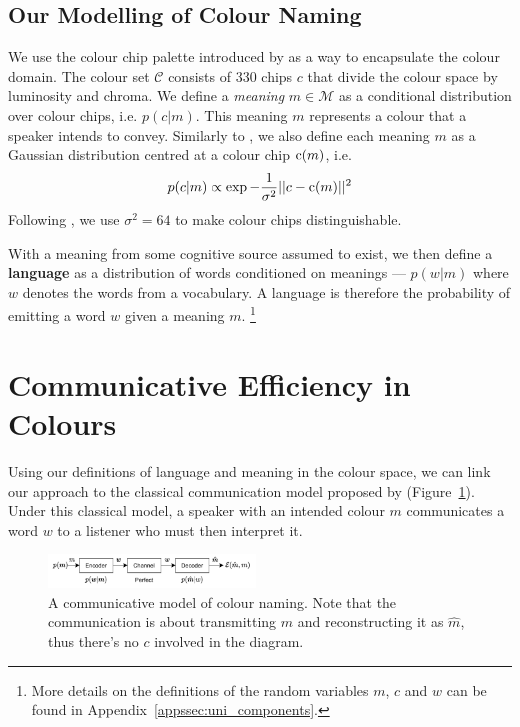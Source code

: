 \documentclass[11pt]{article}
\begin{document}
\subsection{Our Modelling of Colour Naming}
\label{ssec:method_uni_components}

We use the colour chip palette introduced by \citet{berlin1991basic} as a way to encapsulate the colour domain.
The colour set $\mathcal{C}$ consists of $330$ chips $c$ that divide the colour space by luminosity and chroma.
We define a \textit{meaning} $m\in\mathcal{M}$ as a conditional distribution over colour chips, i.e. $p(c|m)$.
This meaning $m$ represents a colour that a speaker intends to convey.
Similarly to \citet{zaslavsky2018efficient}, we also define each meaning $m$ as a Gaussian distribution centred at a colour chip ${\textnormal{c}}(m)$, i.e.
\begin{align}
    p(c|m)\propto \exp{-\frac{1}{\sigma^2}}||c-{\textnormal{c}}(m)||^2
    \label{eq:p_c_given_m}
\end{align}
Following \citet{mokrzycki2011colour}, we use $\sigma^2=64$ to make colour chips distinguishable.

With a meaning from some cognitive source assumed to exist, we then define a \textbf{language} as a distribution of words conditioned on meanings --- $p(w|m)$ where $w$ denotes the words from a vocabulary.
A language is therefore the probability of emitting a word $w$ given a meaning $m$. \footnote{More details on the definitions of the random variables $m$, $c$ and $w$ can be found in Appendix~\ref{appssec:uni_components}.}

\section{Communicative Efficiency in Colours}
\label{ssec:method_comm}

Using our definitions of language and meaning in the colour space, we can link our approach to the classical communication model proposed by \citet{shannon1948mathematical} (Figure~\ref{fig:pipeline}).
Under this classical model, a speaker with an intended colour $m$ communicates a word $w$ to a listener who must then interpret it.

\begin{figure}[h]
    \centering
    \includegraphics[width=0.49\textwidth]{graphs/cog_communication.pdf}
    \caption{
        A communicative model of colour naming.
        Note that the communication is about transmitting $m$ and reconstructing it as $\hat{m}$, thus there's no $c$ involved in the diagram.
    }
    \label{fig:pipeline}
\end{figure}
\end{document}

